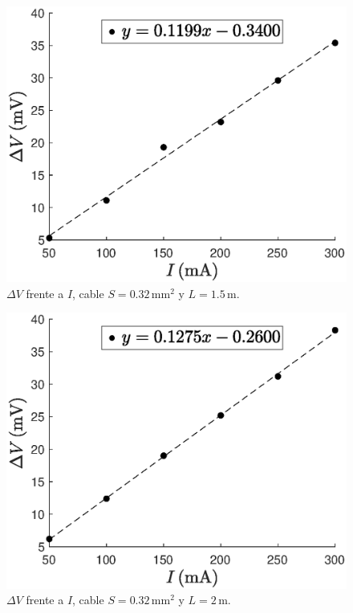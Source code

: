 \begin{figure}[h!]
    \begin{center}
        \includegraphics[width=0.8\columnwidth]{files/images/S3L2}
    \end{center}
    \caption{$\Delta V$ frente a $I$, cable $S = 0.32\,$mm$^2$ y $L = 1.5\,$m.}
    \label{fig:S3L2}
\end{figure}

\begin{figure}[h!]
    \begin{center}
        \includegraphics[width=0.8\columnwidth]{files/images/S3L3}
    \end{center}
    \caption{$\Delta V$ frente a $I$, cable $S = 0.32\,$mm$^2$ y $L = 2\,$m.}
    \label{fig:S3L3}
\end{figure}

